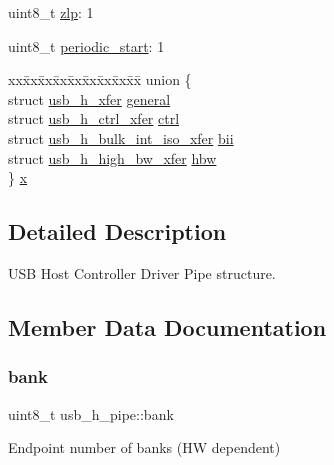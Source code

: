 \begin{DoxyCompactItemize}
\item 
uint8\+\_\+t \hyperlink{structusb__h__pipe_a777c0bcdb187e73738c23213edf27c66}{zlp}\+: 1
\item 
uint8\+\_\+t \hyperlink{structusb__h__pipe_abce16a1866fc0641461a6710e51187f7}{periodic\+\_\+start}\+: 1
\item 
\begin{tabbing}
xx\=xx\=xx\=xx\=xx\=xx\=xx\=xx\=xx\=\kill
union \{\\
\>struct \hyperlink{structusb__h__xfer}{usb\_h\_xfer} \hyperlink{structusb__h__pipe_a0ac1e887b5231aa8fd1495b626c182df}{general}\\
\>struct \hyperlink{structusb__h__ctrl__xfer}{usb\_h\_ctrl\_xfer} \hyperlink{structusb__h__pipe_abd949448cab8f10054ebcb0f1dedfaf4}{ctrl}\\
\>struct \hyperlink{structusb__h__bulk__int__iso__xfer}{usb\_h\_bulk\_int\_iso\_xfer} \hyperlink{structusb__h__pipe_a72de42f88c82a688e01b014ff9700efc}{bii}\\
\>struct \hyperlink{structusb__h__high__bw__xfer}{usb\_h\_high\_bw\_xfer} \hyperlink{structusb__h__pipe_aa71caaedd4bf6bdffd8a23f88a4c7198}{hbw}\\
\} \hyperlink{structusb__h__pipe_ae3ce2d3ae00e7abc79ef4d44ff3c4c8a}{x}\\

\end{tabbing}\end{DoxyCompactItemize}


\subsection{Detailed Description}
U\+SB Host Controller Driver Pipe structure. 

\subsection{Member Data Documentation}
\mbox{\label{structusb__h__pipe_aa3815a946554f8bc314ed46f357cd847}} 
\subsubsection{\texorpdfstring{bank}{bank}}
{\footnotesize\ttfamily uint8\+\_\+t usb\+\_\+h\+\_\+pipe\+::bank}

Endpoint number of banks (HW dependent) \mbox{\label{structusb__h__pipe_a72de42f88c82a688e01b014ff9700efc}} 

